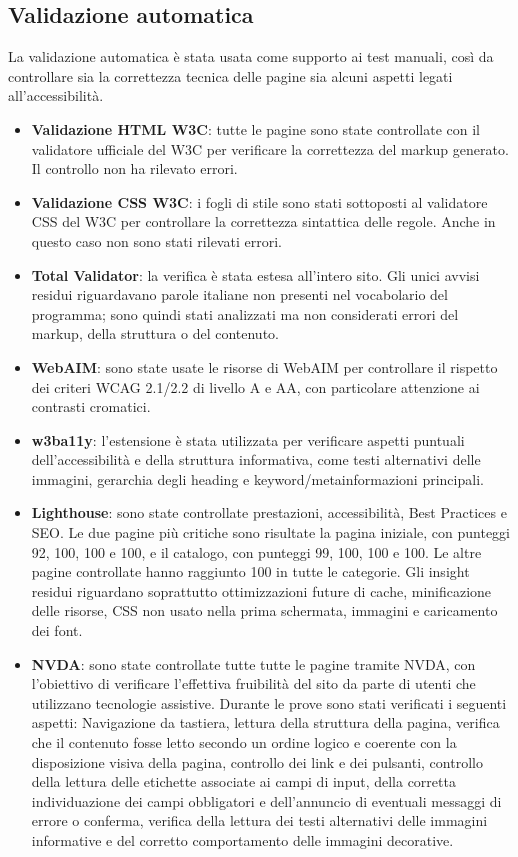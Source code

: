 ﻿\documentclass{article}
\begin{document}
\subsection{Validazione automatica}
La validazione automatica è stata usata come supporto ai test manuali, così da controllare sia la correttezza tecnica delle pagine sia alcuni aspetti legati all'accessibilità.

\begin{itemize}
    \item \textbf{Validazione HTML W3C}: tutte le pagine sono state controllate con il validatore ufficiale del W3C per verificare la correttezza del markup generato. Il controllo non ha rilevato errori.
    \item \textbf{Validazione CSS W3C}: i fogli di stile sono stati sottoposti al validatore CSS del W3C per controllare la correttezza sintattica delle regole. Anche in questo caso non sono stati rilevati errori.
    \item \textbf{Total Validator}: la verifica è stata estesa all'intero sito. Gli unici avvisi residui riguardavano parole italiane non presenti nel vocabolario del programma; sono quindi stati analizzati ma non considerati errori del markup, della struttura o del contenuto.
    \item \textbf{WebAIM}: sono state usate le risorse di WebAIM per controllare il rispetto dei criteri WCAG 2.1/2.2 di livello A e AA, con particolare attenzione ai contrasti cromatici.
    \item \textbf{w3ba11y}: l'estensione è stata utilizzata per verificare aspetti puntuali dell'accessibilità e della struttura informativa, come testi alternativi delle immagini, gerarchia degli heading e keyword/metainformazioni principali.
    \item \textbf{Lighthouse}: sono state controllate prestazioni, accessibilità, Best Practices e SEO. Le due pagine più critiche sono risultate la pagina iniziale, con punteggi 92, 100, 100 e 100, e il catalogo, con punteggi 99, 100, 100 e 100. Le altre pagine controllate hanno raggiunto 100 in tutte le categorie. Gli insight residui riguardano soprattutto ottimizzazioni future di cache, minificazione delle risorse, CSS non usato nella prima schermata, immagini e caricamento dei font.
    \item \textbf{NVDA}: sono state controllate tutte tutte le pagine tramite NVDA, con l'obiettivo di verificare l'effettiva fruibilità del sito da parte di utenti che utilizzano tecnologie assistive. Durante le prove sono stati verificati i seguenti aspetti: Navigazione da tastiera, lettura della struttura della pagina, verifica che il contenuto fosse letto secondo un ordine logico e coerente con la disposizione visiva della pagina, controllo dei link e dei pulsanti, controllo della lettura delle etichette associate ai campi di input, della corretta individuazione dei campi obbligatori e dell'annuncio di eventuali messaggi di errore o conferma, verifica della lettura dei testi alternativi delle immagini informative e del corretto comportamento delle immagini decorative.
\end{itemize}
\end{document}
